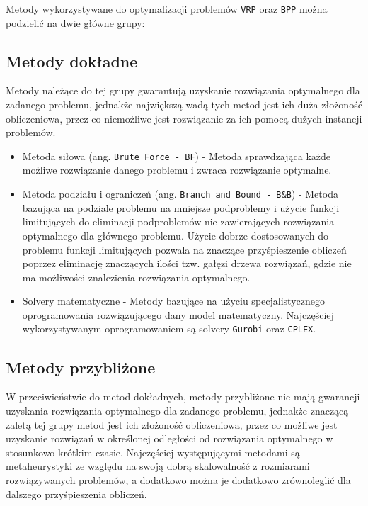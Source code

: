 Metody wykorzystywane do optymalizacji problemów \texttt{VRP} oraz \texttt{BPP} można podzielić na dwie główne grupy:

\subsection{Metody dokładne}
Metody należące do tej grupy gwarantują uzyskanie rozwiązania optymalnego dla zadanego problemu, jednakże największą wadą tych metod jest ich duża złożoność obliczeniowa, przez co niemożliwe jest rozwiązanie za ich pomocą dużych instancji problemów.
\begin{itemize}
    \item Metoda siłowa (ang. \texttt{Brute Force - BF}) - Metoda sprawdzająca każde możliwe rozwiązanie danego problemu i zwraca rozwiązanie optymalne.
    \item Metoda podziału i ograniczeń (ang. \texttt{Branch and Bound - B\&B}) - Metoda bazująca na podziale problemu na mniejsze podproblemy i użycie funkcji limitujących do eliminacji podproblemów nie zawierających rozwiązania optymalnego dla głównego problemu. Użycie dobrze dostosowanych do problemu funkcji limitujących pozwala na znaczące przyśpieszenie obliczeń poprzez eliminację znaczących ilości tzw. gałęzi drzewa rozwiązań, gdzie nie ma możliwości znalezienia rozwiązania optymalnego.
    \item Solvery matematyczne - Metody bazujące na użyciu specjalistycznego oprogramowania rozwiązującego dany model matematyczny. Najczęściej wykorzystywanym oprogramowaniem są solvery \texttt{Gurobi} oraz \texttt{CPLEX}.
\end{itemize}

\subsection{Metody przybliżone}

W przeciwieństwie do metod dokładnych, metody przybliżone nie mają gwarancji uzyskania rozwiązania optymalnego dla zadanego problemu, jednakże znaczącą zaletą tej grupy metod jest ich złożoność obliczeniowa, przez co możliwe jest uzyskanie rozwiązań w określonej odległości od rozwiązania optymalnego w stosunkowo krótkim czasie. Najczęściej występującymi metodami są metaheurystyki ze względu na swoją dobrą skalowalność z rozmiarami rozwiązywanych problemów, a dodatkowo można je dodatkowo zrównoleglić dla dalszego przyśpieszenia obliczeń.

